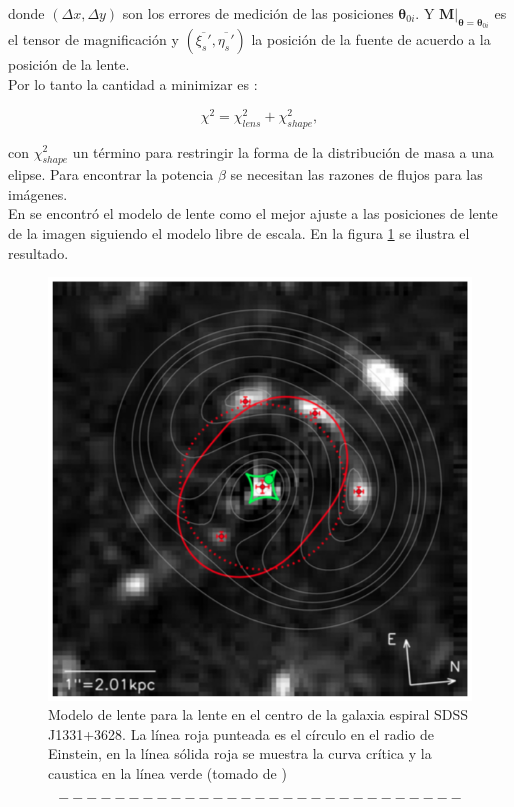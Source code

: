 donde $(\Delta x, \Delta y)$ son los errores de medición de las posiciones $\bm{\theta}_{0i}$. Y $\bm{M}|_{\bm{\theta} = \bm{\theta}_{0i}}$ es el tensor de magnificación y $(\overline{\xi_s'}, \overline{\eta_s'})$ la posición de la fuente de acuerdo a la posición de la lente. \\

Por lo tanto la cantidad a minimizar es \cite{TR16}:

\begin{equation}
\chi^2 = \chi_{lens}^2 + \chi_{shape}^2,
\end{equation}

con $\chi_{shape}^2$ un término para restringir la forma de la distribución de masa a una elipse. Para encontrar la potencia $\beta$ se necesitan las razones de flujos para las imágenes.\\

En \cite{TR16} se encontró el modelo de lente como el mejor ajuste a las posiciones de lente de la imagen siguiendo el modelo libre de escala. En la figura \ref{fig:lens_model} se ilustra el resultado.

\begin{figure}
\centering%
\includegraphics[width=0.8\columnwidth]{Kap3/lens_model.png}%
\caption{Modelo de lente para la lente en el centro de la galaxia espiral SDSS J1331+3628. La línea roja punteada es el círculo en el radio de Einstein, en la línea sólida roja se muestra la curva crítica y la caustica en la línea verde (tomado de \cite{TR16})}
\label{fig:lens_model}
\end{figure}


\begin{equation}
-----------------------------
\end{equation}




